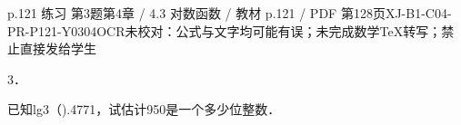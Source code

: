 \begin{bankitem}{p.121 练习 第3题}{第4章 / 4.3 对数函数 / 教材 p.121 / PDF 第128页}{XJ-B1-C04-PR-P121-Y0304}{OCR未校对：公式与文字均可能有误；未完成数学TeX转写；禁止直接发给学生}
\begin{ocrdraft}
\par
3．
\par
已知lg3（).4771，试估计950是一个多少位整数．
\end{ocrdraft}
\end{bankitem}
